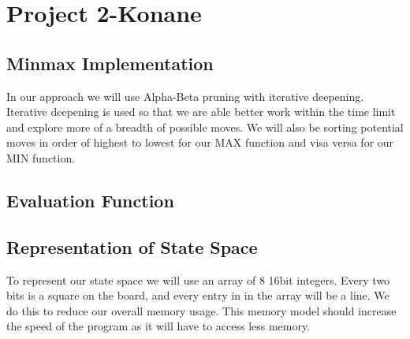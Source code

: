 \documentclass[12pt]{article}
\begin{document}
\section*{Project 2-Konane}

\subsection*{Minmax Implementation}
In our approach we will use Alpha-Beta pruning with iterative deepening.
Iterative deepening is used so that we are able better work within the time limit and explore more of a breadth of possible moves.
We will also be sorting potential moves in order of highest to lowest for our MAX function and visa versa for our MIN function.

\subsection*{Evaluation Function}

\subsection*{Representation of State Space}
To represent our state space we will use an array of 8 16bit integers.
Every two bits is a square on the board, and every entry in in the array will be a line.
We do this to reduce our overall memory usage.
This memory model should increase the speed of the program as it will have to access less memory.
\end{document}
